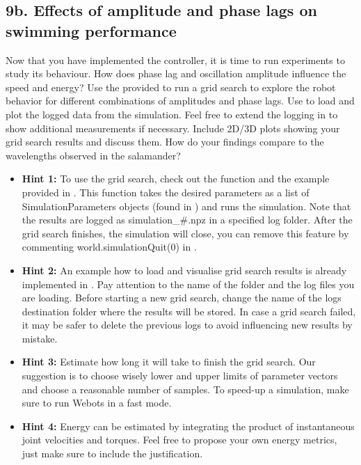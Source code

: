 \documentclass{cmc}
\begin{document}
\subsection*{9b. Effects of amplitude and phase lags on swimming
  performance}
\label{sec:amplitude-phase-performance}

Now that you have implemented the controller, it is time to run experiments to
study its behaviour. How does phase lag and oscillation amplitude influence the
speed and energy? Use the provided 
to run a grid search to explore the robot behavior for different combinations of
amplitudes and phase lags. Use  to load and plot the
logged data from the simulation. Feel free to extend the logging in
 to show additional measurements if necessary. Include 2D/3D
plots showing your grid search results and discuss them. How do your findings
compare to the wavelengths observed in the salamander?


\begin{itemize}
\item \textbf{Hint 1:} To use the grid search, check out the function
   and the example provided in
  . This function takes the desired parameters as a
  list of SimulationParameters objects (found in
  ) and runs the simulation. Note that the
  results are logged as simulation\_\#.npz in a specified log folder. After the
  grid search finishes, the simulation will close, you can remove this feature
  by commenting world.simulationQuit(0) in .
\item \textbf{Hint 2:} An example how to load and visualise grid
  search results is already implemented in
  . Pay attention to the name of the
  folder and the log files you are loading. Before starting a new grid
  search, change the name of the logs destination folder where the
  results will be stored. In case a grid search failed, it may be
  safer to delete the previous logs to avoid influencing new results
  by mistake.
\item \textbf{Hint 3:} Estimate how long it will take to finish the
  grid search. Our suggestion is to choose wisely lower and upper
  limits of parameter vectors and choose a reasonable number of
  samples. To speed-up a simulation, make sure to run Webots in a fast
  mode.
\item \textbf{Hint 4:} Energy can be estimated by integrating the
  product of instantaneous joint velocities and torques. Feel free to
  propose your own energy metrics, just make sure to include the
  justification.
\end{itemize}
\end{document}
